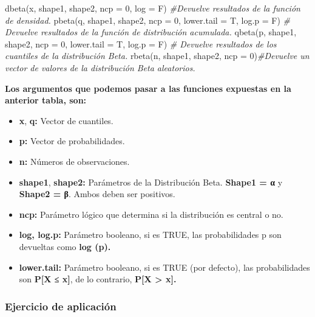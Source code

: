 \documentclass[
]{article}
\newenvironment{Shaded}{\begin{snugshade}}{\end{snugshade}}
\newcommand{\AttributeTok}[1]{\textcolor[rgb]{0.77,0.63,0.00}{#1}}
\newcommand{\CommentTok}[1]{\textcolor[rgb]{0.56,0.35,0.01}{\textit{#1}}}
\newcommand{\DecValTok}[1]{\textcolor[rgb]{0.00,0.00,0.81}{#1}}
\newcommand{\FunctionTok}[1]{\textcolor[rgb]{0.00,0.00,0.00}{#1}}
\newcommand{\NormalTok}[1]{#1}
\begin{document}
\begin{Shaded}
\begin{Highlighting}[]
\FunctionTok{dbeta}\NormalTok{(x, shape1, shape2, }\AttributeTok{ncp =} \DecValTok{0}\NormalTok{, }\AttributeTok{log =}\NormalTok{ F)  }\CommentTok{\#Devuelve resultados de la función de densidad.}
\FunctionTok{pbeta}\NormalTok{(q, shape1, shape2, }\AttributeTok{ncp =} \DecValTok{0}\NormalTok{, }\AttributeTok{lower.tail =}\NormalTok{ T, }\AttributeTok{log.p =}\NormalTok{ F) }\CommentTok{\#  Devuelve resultados de la función de distribución acumulada.}
\FunctionTok{qbeta}\NormalTok{(p, shape1, shape2, }\AttributeTok{ncp =} \DecValTok{0}\NormalTok{, }\AttributeTok{lower.tail =}\NormalTok{ T, }\AttributeTok{log.p =}\NormalTok{ F) }\CommentTok{\#  Devuelve resultados de los cuantiles de la distribución Beta.}
\FunctionTok{rbeta}\NormalTok{(n, shape1, shape2, }\AttributeTok{ncp =} \DecValTok{0}\NormalTok{)}\CommentTok{\#Devuelve un vector de valores de la distribución Beta aleatorios.}
\end{Highlighting}
\end{Shaded}

\textbf{Los argumentos que podemos pasar a las funciones expuestas en la
anterior tabla, son:}

\begin{itemize}
\item
  \textbf{x}, \textbf{q:} Vector de cuantiles.
\item
  \textbf{p:} Vector de probabilidades.
\item
  \textbf{n:} Números de observaciones.
\item
  \textbf{shape1}, \textbf{shape2:} Parámetros de la Distribución Beta.
  \textbf{Shape1 = α} y \textbf{Shape2 = β}. Ambos deben ser positivos.
\item
  \textbf{ncp:} Parámetro lógico que determina si la distribución es
  central o no.
\item
  \textbf{log, log.p:} Parámetro booleano, si es TRUE, las
  probabilidades p son devueltas como \textbf{log (p).}
\item
  \textbf{lower.tail:} Parámetro booleano, si es TRUE (por defecto), las
  probabilidades son \textbf{P{[}X ≤ x{]}}, de lo contrario,
  \textbf{P{[}X \textgreater{} x{]}.}
\end{itemize}

\hypertarget{ejercicio-de-aplicaciuxf3n}{%
\subsubsection{Ejercicio de
aplicación}\label{ejercicio-de-aplicaciuxf3n}}
\end{document}
